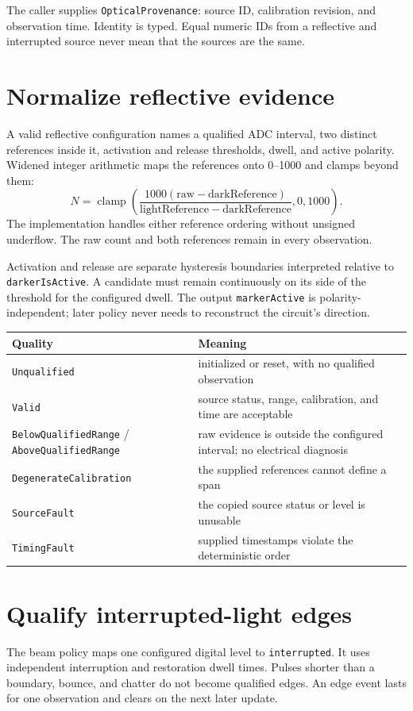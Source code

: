 \documentclass[11pt]{article}
\begin{document}
The caller supplies \texttt{OpticalProvenance}: source ID, calibration
revision, and observation time. Identity is typed. Equal numeric IDs from a
reflective and interrupted source never mean that the sources are the same.

\section{Normalize reflective evidence}
A valid reflective configuration names a qualified ADC interval, two distinct
references inside it, activation and release thresholds, dwell, and active
polarity. Widened integer arithmetic maps the references onto 0--1000 and
clamps beyond them:
\[
 N=\operatorname{clamp}\left(
 \frac{1000(\mathrm{raw}-\mathrm{darkReference})}
 {\mathrm{lightReference}-\mathrm{darkReference}},0,1000\right).
\]
The implementation handles either reference ordering without unsigned
underflow. The raw count and both references remain in every observation.

Activation and release are separate hysteresis boundaries interpreted relative
to \texttt{darkerIsActive}. A candidate must remain continuously on its side
of the threshold for the configured dwell. The output
\texttt{markerActive} is polarity-independent; later policy never needs to
reconstruct the circuit's direction.

\begin{tabularx}{\linewidth}{@{}l X@{}}
\toprule
Quality & Meaning\\
\midrule
\texttt{Unqualified} & initialized or reset, with no qualified observation\\
\texttt{Valid} & source status, range, calibration, and time are acceptable\\
\texttt{BelowQualifiedRange} / \texttt{AboveQualifiedRange} &
raw evidence is outside the configured interval; no electrical diagnosis\\
\texttt{DegenerateCalibration} & the supplied references cannot define a span\\
\texttt{SourceFault} & the copied source status or level is unusable\\
\texttt{TimingFault} & supplied timestamps violate the deterministic order\\
\bottomrule
\end{tabularx}

\section{Qualify interrupted-light edges}
The beam policy maps one configured digital level to
\texttt{interrupted}. It uses independent interruption and restoration dwell
times. Pulses shorter than a boundary, bounce, and chatter do not become
qualified edges. An edge event lasts for one observation and clears on the
next later update.
\end{document}
